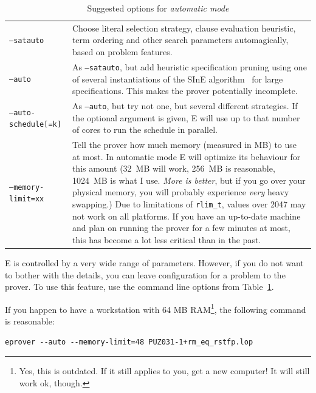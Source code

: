 \documentclass{report}
\begin{document}
\begin{table}[h!]
  \centering
  \small
  \begin{tabular}{lp{8cm}}
    \hline
    \texttt{--satauto}\index{satauto@\texttt{--satauto}}
    & Choose literal selection strategy,  clause
      evaluation heuristic, term ordering and other search parameters
      automagically\index{xyzzy}, based on problem features.\\
    \texttt{--auto}\index{auto@\texttt{--auto}}
    & As \texttt{--satauto}, but add heuristic
      specification pruning using one of several instantiations of the SInE
      algorithm~\cite{HV:CADE-2011} for large specifications. This makes
      the prover potentially incomplete.\\
    \texttt{--auto-schedule[=k]}\index{auto-schedule@\texttt{--auto-schedule}}\index{strategy scheduling}
    & As \texttt{--auto}, but try not one, but
      several different strategies. If the optional argument is given, E
      will use up to that number of cores to run the schedule in
      parallel.\\
    \texttt{--memory-limit=xx}\index{memory-limit@\texttt{--memory-limit}}\index{resource limits!memory}
    & Tell the prover how much memory
      (measured in MB) to use at most. In automatic mode E will optimize
      its behaviour for this amount (32~MB will work, 256~MB is
      reasonable, 1024~MB is what I use. \emph{More is
      better}\footnotemark, but if you go over
      your physical memory, you will probably experience \emph{very} heavy
      swapping.) Due to limitations of \texttt{rlim\_t}, values over 2047
      may not work on all platforms. If you have an up-to-date machine
      and plan on running the prover for a few minutes at most, this has
      become a lot less critical than in the past.\\
    \hline
  \end{tabular}
  \normalsize
  \caption{Suggested options for \emph{automatic mode}}
  \label{tab:auto_options}
\end{table}

E is controlled by a very wide range of parameters. However, if you do
not want to bother with the details, you can leave configuration for a
problem to the prover. To use this feature, use the command
line options from Table~\ref{tab:auto_options}.

\begin{example}
  If you happen to have a workstation with 64 MB RAM\footnote{Yes,
    this is outdated. If it still applies to you, get a new
    computer! It will still work ok, though.}, the following command
  is reasonable:\nopagebreak
\small\nopagebreak
\begin{verbatim}
eprover --auto --memory-limit=48 PUZ031-1+rm_eq_rstfp.lop
\end{verbatim}
  \normalsize
\end{example}
\end{document}
